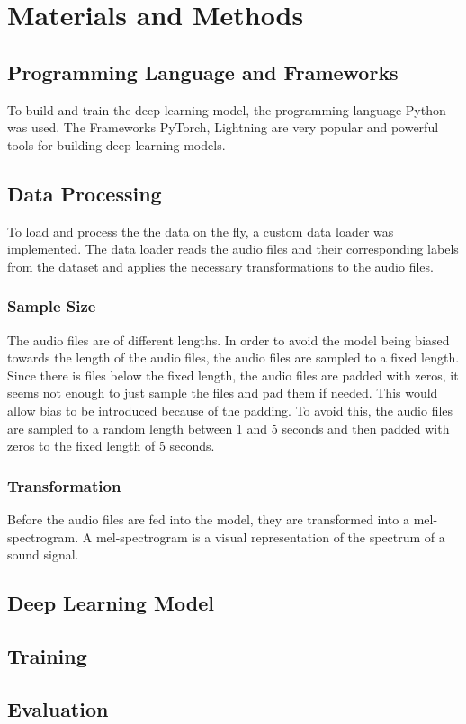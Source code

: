 

\section{Materials and Methods}
\label{section2}

\subsection{Programming Language and Frameworks}
To build and train the deep learning model, the programming language Python was used.
The Frameworks PyTorch, Lightning are very popular and powerful tools for building deep learning models.

\subsection{Data Processing}
To load and process the the data on the fly, a custom data loader was implemented. 
The data loader reads the audio files and their corresponding labels from the dataset 
and applies the necessary transformations to the audio files.

\subsubsection{Sample Size}
The audio files are of different lengths. In order to avoid the model being biased towards 
the length of the audio files, the audio files are sampled to a fixed length. Since there is
files below the fixed length, the audio files are padded with zeros, it seems not enough to 
just sample the files and pad them if needed. This would allow bias to be introduced because
of the padding. To avoid this, the audio files are sampled to a random length between 1 and 5
seconds and then padded with zeros to the fixed length of 5 seconds.

\subsubsection{Transformation}
Before the audio files are fed into the model, they are transformed into a mel-spectrogram.
A mel-spectrogram is a visual representation of the spectrum of a sound signal. 


\subsection{Deep Learning Model}


\subsection{Training}


\subsection{Evaluation}